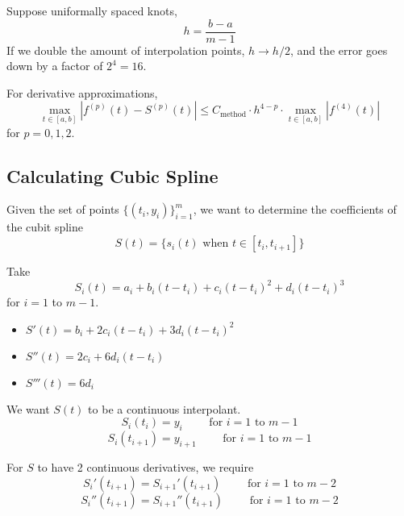 Suppose uniformally spaced knots, \[
    h = \frac{b - a}{m - 1}
\] If we double the amount of interpolation points, \( h \to h/2 \), and the error goes down by a factor of \( 2^4 = 16 \).

\begin{remark}
    For derivative approximations, \[
        \max_{t \in [a,b]} | f^{(p)}(t) - S^{(p)}(t) | \leq C_{\text{method}} \cdot h^{4-p} \cdot \max_{t \in [a, b]} | f^{(4)}(t) |
    \] for \( p = 0, 1, 2 \).
\end{remark}

\subsection{Calculating Cubic Spline}

Given the set of points \( \{ (t_i, y_i) \}_{i=1}^{m} \), we want to determine the coefficients of the cubit spline \[
    S(t) = \{ s_i(t) \text{ when } t \in [t_i, t_{i+1}] \}
\]

Take \[
    S_i(t) = a_i + b_i(t - t_i) + c_i(t - t_i)^2 + d_i(t - t_i)^3
\] for \( i = 1 \) to \( m - 1 \).

\begin{itemize}
    \item \( S'(t) = b_i + 2c_i(t - t_i) + 3d_i(t - t_i)^2 \)
    \item \( S''(t) = 2c_i + 6d_i(t - t_i) \)
    \item \( S'''(t) = 6d_i \)
\end{itemize}

We want \( S(t) \) to be a continuous interpolant.
\begin{equation}\label{eq:cubic-spline-1}
    S_i(t_i) = y_i \qquad \text{ for } i = 1 \text{ to } m-1
\end{equation}\begin{equation}\label{eq:cubic-spline-2}
    S_i(t_{i+1}) = y_{i+1} \qquad \text{ for } i = 1 \text{ to } m-1
\end{equation}

For \( S \) to have 2 continuous derivatives, we require \begin{equation}\label{eq:cubic-spline-3}
    S_i'(t_{i+1}) = S_{i+1}'(t_{i+1}) \qquad \text{ for } i = 1 \text{ to } m-2
\end{equation}\begin{equation}\label{eq:cubic-spline-4}
    S_i''(t_{i+1}) = S_{i+1}''(t_{i+1}) \qquad \text{ for } i = 1 \text{ to } m-2
\end{equation}

